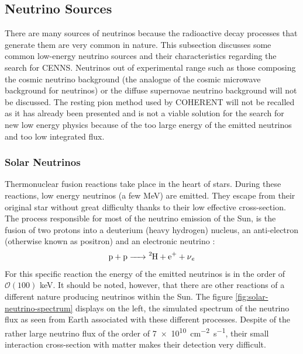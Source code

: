 \subsection{Neutrino Sources}

There are many sources of neutrinos because the radioactive decay processes that generate them are very common in nature. This subsection discusses some common low-energy neutrino sources and their characteristics regarding the search for CENNS. Neutrinos out of experimental range such as those composing the cosmic neutrino background (the analogue of the cosmic microwave background for neutrinos) or the diffuse supernovae neutrino background will not be discussed. The resting pion method used by COHERENT will not be recalled as it has already been presented and is not a viable solution for the search for new low energy physics because of the too large energy of the emitted neutrinos and too low integrated flux.

\subsubsection{Solar Neutrinos}

Thermonuclear fusion reactions take place in the heart of stars. During these reactions, low energy neutrinos (a few \si{\mega\eV}) are emitted. They escape from their original star without great difficulty thanks to their low effective cross-section. The process responsible for most of the neutrino emission of the Sun, is the fusion of two protons  into a  deuterium (heavy hydrogen) nucleus, an anti-electron  (otherwise known as positron) and an electronic neutrino :
\begin{equation}
\ce{ p + p -> {}^2H + e^+ + $\nu$_e }
\end{equation}
For this specific reaction the energy of the emitted neutrinos is in the order of $\mathcal{O}(100)$ \si{\kilo\eV}. It should be noted, however, that there are other reactions of a different nature producing neutrinos within the Sun. The figure \ref{fig:solar-neutrino-spectrum} displays on the left, the simulated spectrum of the neutrino flux as seen from Earth associated with these different processes.
Despite of the rather large neutrino flux of the order of \SI{7e10}{\cm^{-2} \s^{-1}}, their small interaction cross-section with matter makes their detection very difficult.

